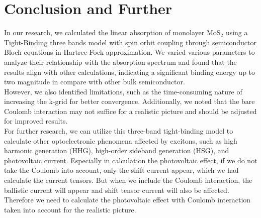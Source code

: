 \documentclass[12pt,english,a4paper]{article}
\begin{document}
\section{Conclusion and Further}
\quad In our research, we calculated the linear absorption of monolayer $\mathrm{MoS}_2$ using a Tight-Binding three bands model with spin orbit coupling through semiconductor Bloch equations in Hartree-Fock approximation. We varied various parameters to analyze their relationship with the absorption spectrum and found that the results align with other calculations, indicating a significant binding energy up to two magnitude in compare with other bulk semiconductor.\\\null
\quad However, we also identified limitations, such as the time-consuming nature of increasing the k-grid for better convergence. Additionally, we noted that the bare Coulomb interaction may not suffice for a realistic picture and should be adjusted for improved results.\\\null
\quad For further research, we can utilize this three-band tight-binding model to calculate other optoelectronic phenomena affected by excitons, such as high harmonic generation (HHG), high-order sideband generation (HSG), and photovoltaic current. Especially in calculation the photovoltaic effect, if we do not take the Coulomb into account, only the shift current appear, which we had calculate the current tensors\cite{vo_calculation_2024}. But when we include the Coulomb interaction, the ballistic current will appear and shift tensor current will also be affected. Therefore we need to calculate the photovoltaic effect with Coulomb interaction taken into account for the realistic picture.
\newpage


\newpage
{}
\end{document}

